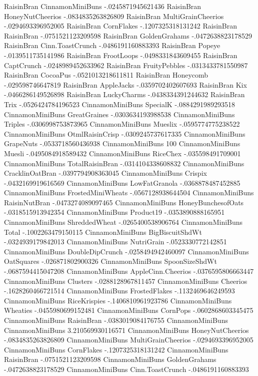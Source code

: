 RaisinBran	CinnamonMiniBuns	-.0245871945621436
RaisinBran	HoneyNutCheerios	-.0834835263826809
RaisinBran	MultiGrainCheerios	-.0294693396952005
RaisinBran	CornFlakes	-.1207325318131242
RaisinBran	RaisinBran	-.0751521123209598
RaisinBran	GoldenGrahams	-.0472638823178529
RaisinBran	Cinn.ToastCrunch	-.0486191160883393
RaisinBran	Popeye	-.0139511735141986
RaisinBran	FrootLoops	-.0498331843609455
RaisinBran	CaptCrunch	-.0248989452633962
RaisinBran	FruityPebbles	-.0313433781550987
RaisinBran	CocoaPus	-.0521013218611811
RaisinBran	Honeycomb	-.029598746647819
RaisinBran	AppleJacks	-.0359702402607693
RaisinBran	Kix	-.0466286149526898
RaisinBran	LuckyCharms	-.0438334391244632
RaisinBran	Trix	-.0526424784196523
CinnamonMiniBuns	SpecialK	-.0884291989293518
CinnamonMiniBuns	GreatGraines	-.0303634193988538
CinnamonMiniBuns	Triples	-.0306998753873965
CinnamonMiniBuns	Mueslix	-.0595774775238522
CinnamonMiniBuns	OtmlRaisinCrisp	-.0309245737617335
CinnamonMiniBuns	GrapeNuts	-.0533718560436938
CinnamonMiniBuns	100%
CinnamonMiniBuns	Muesli	-.0495084918589432
CinnamonMiniBuns	RiceChex	-.035598491709001
CinnamonMiniBuns	TotalRaisinBran	-.0314104338608832
CinnamonMiniBuns	CracklinOatBran	-.0397794908363045
CinnamonMiniBuns	Crispix	-.0432169919616569
CinnamonMiniBuns	LowFatGranola	-.0368878487452885
CinnamonMiniBuns	FrostedMiniWheats	-.0567128938644504
CinnamonMiniBuns	RaisinNutBran	-.0473274089097465
CinnamonMiniBuns	HoneyBunchesofOats	-.0318515913942354
CinnamonMiniBuns	Product19	-.0353890888165951
CinnamonMiniBuns	ShreddedWheat	-.0265400538906764
CinnamonMiniBuns	Total	-.1002263479150115
CinnamonMiniBuns	BigBiscuitShdWt	-.0324939179842013
CinnamonMiniBuns	NutriGrain	-.0523330772142851
CinnamonMiniBuns	DoubleDipCrunch	-.0258494942460097
CinnamonMiniBuns	OatSquares	-.026871802900326
CinnamonMiniBuns	SpoonSizeShdWt	-.0687594415047208
CinnamonMiniBuns	AppleCinn.Cheerios	-.0376595806663447
CinnamonMiniBuns	Clusters	-.0288128967811457
CinnamonMiniBuns	Cheerios	-.1628260466721514
CinnamonMiniBuns	FrostedFlakes	-.1132469646249593
CinnamonMiniBuns	RiceKrispies	-.1406810961923786
CinnamonMiniBuns	Wheaties	-.0455980699152481
CinnamonMiniBuns	CornPops	-.0602868603345475
CinnamonMiniBuns	RaisinBran	-.0383019084176755
CinnamonMiniBuns	CinnamonMiniBuns	3.210569930116571
CinnamonMiniBuns	HoneyNutCheerios	-.0834835263826809
CinnamonMiniBuns	MultiGrainCheerios	-.0294693396952005
CinnamonMiniBuns	CornFlakes	-.1207325318131242
CinnamonMiniBuns	RaisinBran	-.0751521123209598
CinnamonMiniBuns	GoldenGrahams	-.0472638823178529
CinnamonMiniBuns	Cinn.ToastCrunch	-.0486191160883393
